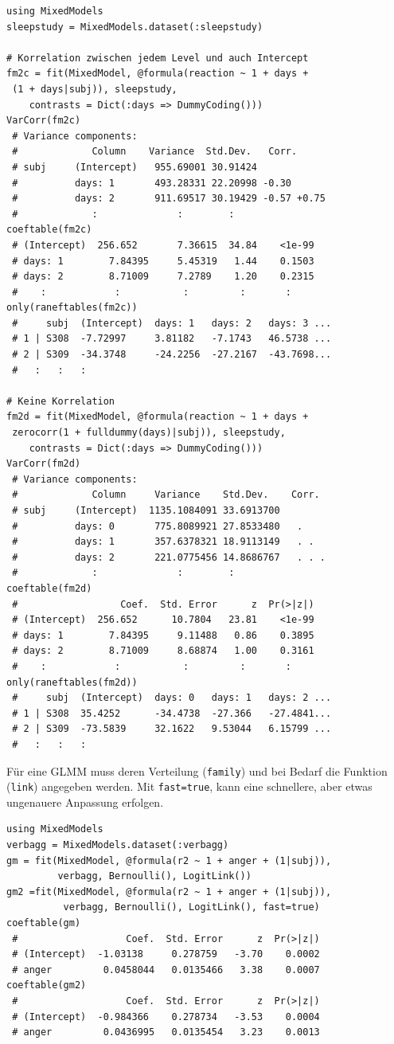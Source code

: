 \documentclass[10pt,twocolumn]{scrartcl}
\begin{document}
\begin{lstlisting}
using MixedModels
sleepstudy = MixedModels.dataset(:sleepstudy)

# Korrelation zwischen jedem Level und auch Intercept
fm2c = fit(MixedModel, @formula(reaction ~ 1 + days +
 (1 + days|subj)), sleepstudy,
    contrasts = Dict(:days => DummyCoding()))
VarCorr(fm2c)
 # Variance components:
 #             Column    Variance  Std.Dev.   Corr.
 # subj     (Intercept)   955.69001 30.91424
 #          days: 1       493.28331 22.20998 -0.30
 #          days: 2       911.69517 30.19429 -0.57 +0.75
 #             :              :        :
coeftable(fm2c)
 # (Intercept)  256.652       7.36615  34.84    <1e-99
 # days: 1        7.84395     5.45319   1.44    0.1503
 # days: 2        8.71009     7.2789    1.20    0.2315
 #    :            :           :         :       :
only(raneftables(fm2c))
 #     subj  (Intercept)  days: 1   days: 2   days: 3 ...
 # 1 | S308  -7.72997     3.81182   -7.1743   46.5738 ...
 # 2 | S309  -34.3748     -24.2256  -27.2167  -43.7698...
 #   :   :   :

# Keine Korrelation
fm2d = fit(MixedModel, @formula(reaction ~ 1 + days +
 zerocorr(1 + fulldummy(days)|subj)), sleepstudy,
    contrasts = Dict(:days => DummyCoding()))
VarCorr(fm2d)
 # Variance components:
 #             Column     Variance    Std.Dev.    Corr.
 # subj     (Intercept)  1135.1084091 33.6913700
 #          days: 0       775.8089921 27.8533480   .
 #          days: 1       357.6378321 18.9113149   . .
 #          days: 2       221.0775456 14.8686767   . . .
 #             :              :        :
coeftable(fm2d)
 #                  Coef.  Std. Error      z  Pr(>|z|)
 # (Intercept)  256.652      10.7804   23.81    <1e-99
 # days: 1        7.84395     9.11488   0.86    0.3895
 # days: 2        8.71009     8.68874   1.00    0.3161
 #    :            :           :         :       :
only(raneftables(fm2d))
 #     subj  (Intercept)  days: 0   days: 1   days: 2 ...
 # 1 | S308  35.4252      -34.4738  -27.366   -27.4841...
 # 2 | S309  -73.5839     32.1622   9.53044   6.15799 ...
 #   :   :   :
\end{lstlisting}

Für eine GLMM muss deren Verteilung (\lstinline|family|) und bei Bedarf die
Funktion (\lstinline|link|) angegeben werden. Mit \lstinline|fast=true|, kann
eine schnellere, aber etwas ungenauere Anpassung erfolgen.

\begin{lstlisting}
using MixedModels
verbagg = MixedModels.dataset(:verbagg)
gm = fit(MixedModel, @formula(r2 ~ 1 + anger + (1|subj)),
         verbagg, Bernoulli(), LogitLink())
gm2 =fit(MixedModel, @formula(r2 ~ 1 + anger + (1|subj)),
          verbagg, Bernoulli(), LogitLink(), fast=true)
coeftable(gm)
 #                   Coef.  Std. Error      z  Pr(>|z|)
 # (Intercept)  -1.03138     0.278759   -3.70    0.0002
 # anger         0.0458044   0.0135466   3.38    0.0007
coeftable(gm2)
 #                   Coef.  Std. Error      z  Pr(>|z|)
 # (Intercept)  -0.984366    0.278734   -3.53    0.0004
 # anger         0.0436995   0.0135454   3.23    0.0013
\end{lstlisting}
\end{document}
